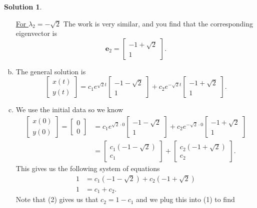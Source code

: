 \documentclass[12pt]{report} %
\theoremstyle{definition}
\newtheorem{solution}{Solution}
\begin{document}
\begin{solution}
\begin{enumerate}[(a)]
    \noindent \underline{For $\lambda_2=-\sqrt{2}$}
    The work is very similar, and you find that the corresponding eigenvector is
    \[
    \mathbf{e}_2 = \begin{bmatrix} -1+\sqrt{2} \\ 1 \end{bmatrix}.
    \]
    \item The general solution is
    \[
    \begin{bmatrix} x(t) \\ y(t) \end{bmatrix} = c_1 e^{\sqrt{2}t} \begin{bmatrix} -1-\sqrt{2} \\ 1 \end{bmatrix} + c_2 e^{-\sqrt{2}t} \begin{bmatrix} -1 + \sqrt{2} \\ 1 \end{bmatrix}.
    \]
    \item We use the initial data so we know
    \begin{align*}
    \begin{bmatrix} x(0) \\ y(0) \end{bmatrix} = \begin{bmatrix} 0 \\ 0 \end{bmatrix} &= c_1 e^{\sqrt{2}\cdot 0} \begin{bmatrix} -1-\sqrt{2} \\ 1 \end{bmatrix} + c_2 e^{-\sqrt{2}\cdot 0} \begin{bmatrix} -1 + \sqrt{2} \\ 1 \end{bmatrix}\\
    &= \begin{bmatrix} c_1(-1-\sqrt{2}) \\ c_1 \end{bmatrix} + \begin{bmatrix} c_2 (-1+\sqrt{2})\\ c_2 \end{bmatrix}.
    \end{align*}
    This gives us the following system of equations
    \begin{align}
        1 &= c_1(-1-\sqrt{2})+c_2(-1+\sqrt{2})\\
        1 &= c_1 + c_2.
    \end{align}
    Note that (2) gives us that $c_2=1-c_1$ and we plug this into (1) to find

\end{enumerate}
\end{solution}
\end{document}
